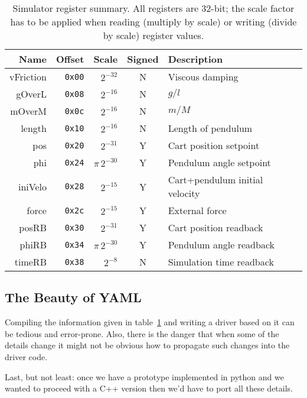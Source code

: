 \documentclass[10pt]{article}
\newcommand{\py}        {python}
\newcommand{\cpp}       {C++}
\newcommand{\cod}[1] {{\tt#1}}
\newcounter{tbls}
\begin{document}
\begin{table}[ht]
\label{tbl:regs}
\hspace*{\fill}
\begin{tabular}{rrrcl}
         Name &     Offset & Scale        & Signed & Description       \\
\hline
    vFriction & \cod{0x00} & $2^{-32}$    & N & Viscous damping   \\
       gOverL & \cod{0x08} & $2^{-16}$    & N & $g/l$             \\
       mOverM & \cod{0x0c} & $2^{-16}$    & N & $m/M$             \\
       length & \cod{0x10} & $2^{-16}$    & N & Length of pendulum\\
          pos & \cod{0x20} & $2^{-31}$    & Y & Cart position setpoint\\
          phi & \cod{0x24} & $\pi\, 2^{-30}$& Y & Pendulum angle setpoint\\
      iniVelo & \cod{0x28} & $2^{-15}$    & Y & Cart+pendulum initial velocity\\
        force & \cod{0x2c} & $2^{-15}$    & Y & External force\\
\hline
        posRB & \cod{0x30} & $2^{-31}$    & Y & Cart position readback\\
        phiRB & \cod{0x34} & $\pi\, 2^{-30}$& Y & Pendulum angle readback\\
       timeRB & \cod{0x38} & $2^{-8}$     & N & Simulation time readback\\
\end{tabular}
\hspace*{\fill}
\caption{Simulator register summary. All registers are 32-bit; the scale factor has
to be applied when reading (multiply by scale) or writing (divide by scale) register
values.}
\end{table}

\subsection{The Beauty of YAML}
Compiling the information given in table~\ref{tbl:regs} and writing a driver based
on it can be tedious and error-prone. Also, there is the danger that when some of
the details change it might not be obvious how to propagate such changes into the
driver code.

Last, but not least: once we have a prototype implemented in \py{} and we wanted
to proceed with a \cpp{} version then we'd have to port all these details.
\end{document}
